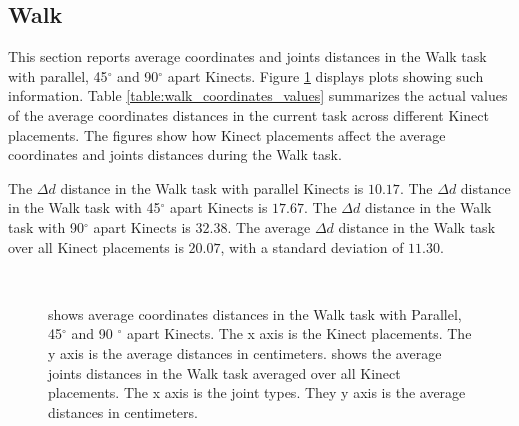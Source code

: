 % 
% 
\subsection{Walk}

This section reports average coordinates and joints distances in the Walk task with parallel, 45$^{\circ}$ and 90$^{\circ}$ apart Kinects. Figure \ref{fig:walk_coordinates_joints} displays plots showing such information. Table \ref{table:walk_coordinates_values} summarizes the actual values of the average coordinates distances in the current task across different Kinect placements. The figures show how Kinect placements affect the average coordinates and joints distances during the Walk task.

The $\Delta d$ distance in the Walk task with parallel Kinects is $10.17$. The $\Delta d$ distance in the Walk task with 45$^{\circ}$ apart Kinects is $17.67$. The $\Delta d$ distance in the Walk task with 90$^{\circ}$ apart Kinects is $32.38$. The average $\Delta d$ distance in the Walk task over all Kinect placements is $20.07$, with a standard deviation of $11.30$.

\begin{figure}[!htb]
  \centering

  \subfloat[]{
    
    \label{fig:walk_coordinates}
  } \\
  \subfloat[]{
    
    \label{fig:walk_joints}
  }

  \caption{\protect{} shows average coordinates distances in the Walk task with Parallel, 45$^{\circ}$ and 90 $^{\circ}$ apart Kinects. The x axis is the Kinect placements. The y axis is the average distances in centimeters. \protect{} shows the average joints distances in the Walk task averaged over all Kinect placements. The x axis is the joint types. They y axis is the average distances in centimeters.}

  \label{fig:walk_coordinates_joints}
\end{figure}

